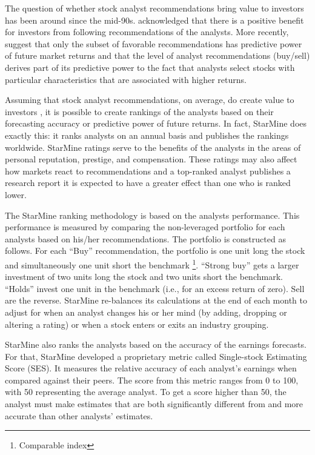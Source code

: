 The question of whether stock analyst recommendations bring value to investors has been around since the mid-90s. \cite{womack1996} acknowledged that there is a positive benefit for investors from following recommendations of the analysts.
More recently, \cite{jegadeesh2004} suggest that only the subset of favorable recommendations has predictive power of future market returns and that the level of analyst recommendations (buy/sell) derives part of its predictive power to the fact that analysts select stocks with particular characteristics that are associated with higher returns.


Assuming that stock analyst recommendations, on average, do create value to investors \citep{womack1996,barber2001}, it is possible to create rankings of the analysts based on their forecasting accuracy or predictive power of future returns. In fact, StarMine\textsuperscript{\textregistered}
does exactly this: it ranks analysts on an annual basis and publishes the rankings worldwide. 
StarMine ratings serve to the benefits of the analysts in the areas of personal reputation, prestige, and compensation. These ratings may also affect how markets react to recommendations and a top-ranked analyst publishes a research report it is expected to have a greater effect than one who is ranked lower. 

The StarMine ranking methodology is based on the analysts performance. This performance is measured by comparing the non-leveraged portfolio for each analysts based on his/her recommendations. The portfolio is constructed as follows. For each ``Buy'' recommendation, the portfolio is one unit long the stock and simultaneously one unit short the benchmark \footnote{Comparable index}. ``Strong buy'' gets a larger investment of two units long the stock and two units short the benchmark. ``Holds'' invest one unit in the benchmark (i.e., for an excess return of zero). Sell are the reverse. StarMine re-balances its calculations at the end of each month to adjust for when an analyst changes his or her mind (by adding, dropping or altering a rating) or when a stock enters or exits an industry grouping. 

StarMine also ranks the analysts based on the accuracy of the earnings forecasts. For that, StarMine developed a proprietary metric called Single-stock Estimating Score (SES). It measures the relative accuracy of each analyst's earnings when compared against their peers. 
The score from this metric ranges from 0 to 100, with 50 representing the average analyst. To get a score higher than 50, the analyst must make estimates that are both significantly different from and more accurate than other analysts' estimates. 

